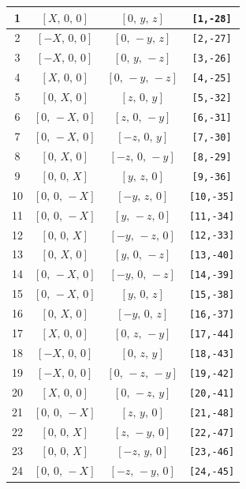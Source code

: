 \documentclass[fleqn,8pt]{jsarticle}
\begin{document}
\begin{longtable}{cccc}
1 & $\left[ X,\, 0,\, 0 \right]$ & $\left[ 0,\, y,\, z \right]$ & {\tt [1,-28]} \\ \hline
2 & $\left[ - X,\, 0,\, 0 \right]$ & $\left[ 0,\, - y,\, z \right]$ & {\tt [2,-27]} \\ \hline
3 & $\left[ - X,\, 0,\, 0 \right]$ & $\left[ 0,\, y,\, - z \right]$ & {\tt [3,-26]} \\ \hline
4 & $\left[ X,\, 0,\, 0 \right]$ & $\left[ 0,\, - y,\, - z \right]$ & {\tt [4,-25]} \\ \hline
5 & $\left[ 0,\, X,\, 0 \right]$ & $\left[ z,\, 0,\, y \right]$ & {\tt [5,-32]} \\ \hline
6 & $\left[ 0,\, - X,\, 0 \right]$ & $\left[ z,\, 0,\, - y \right]$ & {\tt [6,-31]} \\ \hline
7 & $\left[ 0,\, - X,\, 0 \right]$ & $\left[ - z,\, 0,\, y \right]$ & {\tt [7,-30]} \\ \hline
8 & $\left[ 0,\, X,\, 0 \right]$ & $\left[ - z,\, 0,\, - y \right]$ & {\tt [8,-29]} \\ \hline
9 & $\left[ 0,\, 0,\, X \right]$ & $\left[ y,\, z,\, 0 \right]$ & {\tt [9,-36]} \\ \hline
10 & $\left[ 0,\, 0,\, - X \right]$ & $\left[ - y,\, z,\, 0 \right]$ & {\tt [10,-35]} \\ \hline
11 & $\left[ 0,\, 0,\, - X \right]$ & $\left[ y,\, - z,\, 0 \right]$ & {\tt [11,-34]} \\ \hline
12 & $\left[ 0,\, 0,\, X \right]$ & $\left[ - y,\, - z,\, 0 \right]$ & {\tt [12,-33]} \\ \hline
13 & $\left[ 0,\, X,\, 0 \right]$ & $\left[ y,\, 0,\, - z \right]$ & {\tt [13,-40]} \\ \hline
14 & $\left[ 0,\, - X,\, 0 \right]$ & $\left[ - y,\, 0,\, - z \right]$ & {\tt [14,-39]} \\ \hline
15 & $\left[ 0,\, - X,\, 0 \right]$ & $\left[ y,\, 0,\, z \right]$ & {\tt [15,-38]} \\ \hline
16 & $\left[ 0,\, X,\, 0 \right]$ & $\left[ - y,\, 0,\, z \right]$ & {\tt [16,-37]} \\ \hline
17 & $\left[ X,\, 0,\, 0 \right]$ & $\left[ 0,\, z,\, - y \right]$ & {\tt [17,-44]} \\ \hline
18 & $\left[ - X,\, 0,\, 0 \right]$ & $\left[ 0,\, z,\, y \right]$ & {\tt [18,-43]} \\ \hline
19 & $\left[ - X,\, 0,\, 0 \right]$ & $\left[ 0,\, - z,\, - y \right]$ & {\tt [19,-42]} \\ \hline
20 & $\left[ X,\, 0,\, 0 \right]$ & $\left[ 0,\, - z,\, y \right]$ & {\tt [20,-41]} \\ \hline
21 & $\left[ 0,\, 0,\, - X \right]$ & $\left[ z,\, y,\, 0 \right]$ & {\tt [21,-48]} \\ \hline
22 & $\left[ 0,\, 0,\, X \right]$ & $\left[ z,\, - y,\, 0 \right]$ & {\tt [22,-47]} \\ \hline
23 & $\left[ 0,\, 0,\, X \right]$ & $\left[ - z,\, y,\, 0 \right]$ & {\tt [23,-46]} \\ \hline
24 & $\left[ 0,\, 0,\, - X \right]$ & $\left[ - z,\, - y,\, 0 \right]$ & {\tt [24,-45]} \\
\end{longtable}
\end{document}
